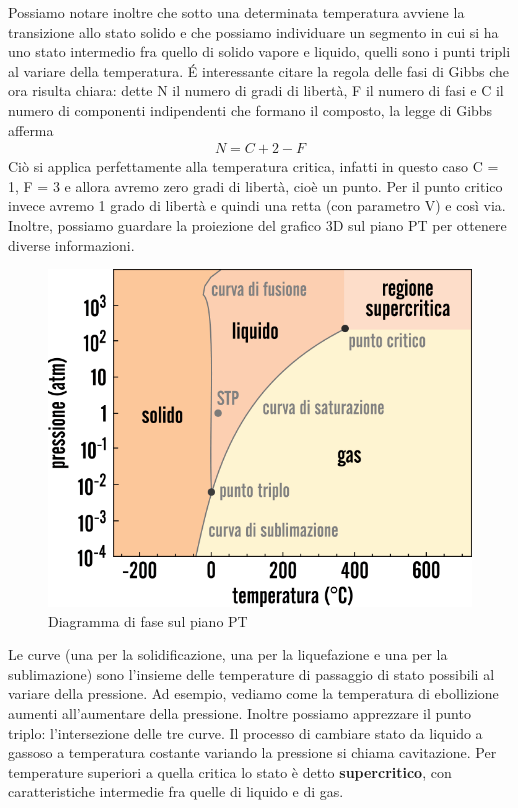 \documentclass[10pt,a4paper]{article}
\begin{document}
\FloatBarrier
Possiamo notare inoltre che sotto una determinata temperatura avviene la transizione allo stato solido e che possiamo individuare un segmento in cui si ha uno stato intermedio fra quello di solido vapore e liquido, quelli sono i punti tripli al variare della temperatura. \'{E} interessante citare la regola delle fasi di Gibbs che ora risulta chiara: dette N il numero di gradi di libertà, F il numero di fasi e C il numero di componenti indipendenti che formano il composto, la legge di Gibbs afferma
\begin{align*} 
	N = C + 2 - F
\end{align*}  
Ciò si applica perfettamente alla temperatura critica, infatti in questo caso C = 1, F = 3 e allora avremo zero gradi di libertà, cioè un punto. Per il punto critico invece avremo 1 grado di libertà e quindi una retta (con parametro V) e così via.\\
Inoltre, possiamo guardare la proiezione del grafico 3D sul piano PT per ottenere diverse informazioni. 
\begin{figure}[h!]
	\centering
	\includegraphics[width=0.6\linewidth]{../images/diagrammadifasePT}
	\caption{Diagramma di fase sul piano PT}
	\label{fig:diagrammadifasept}
\end{figure}
\FloatBarrier
Le curve (una per la solidificazione, una per la liquefazione e una per la sublimazione) sono l'insieme delle temperature di passaggio di stato possibili al variare della pressione. Ad esempio, vediamo come la temperatura di ebollizione aumenti all'aumentare della pressione. Inoltre possiamo apprezzare il punto triplo: l'intersezione delle tre curve. Il processo di cambiare stato da liquido a gassoso a temperatura costante variando la pressione si chiama cavitazione. Per temperature superiori a quella critica lo stato è detto \textbf{supercritico}, con caratteristiche intermedie fra quelle di liquido e di gas. 
\end{document}
